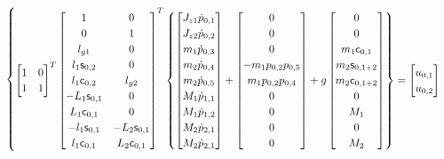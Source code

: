 \begin{itemize}
\begin{equation}
\begin{cases}
\begin{bmatrix}
1 & 0 \\
1 & 1 \\
\end{bmatrix}^T
\begin{bmatrix}
 1 & 0 \\
 0 & 1 \\
 l_{g1} & 0 \\
 l_1 \mathsf{s}_{0,2} & 0 \\
 l_1 \mathsf{c}_{0,2} & l_{g2} \\
 -L_1 \mathsf{s}_{0,1} & 0 \\
 L_1 \mathsf{c}_{0,1} & 0 \\
 -l_1 \mathsf{s}_{0,1} & -L_2 \mathsf{s}_{0,1} \\
 l_1 \mathsf{c}_{0,1} & L_2 \mathsf{c}_{0,1} \\
\end{bmatrix}^T
\begin{Bmatrix}
	\begin{bmatrix}
	J_{z1} \dot{p}_{0,1} \\
	J_{z2} \dot{p}_{0,2} \\
	m_1 \dot{p}_{0,3} \\
	m_2 \dot{p}_{0,4} \\
	m_2 \dot{p}_{0,5} \\
	M_1 \dot{p}_{1,1} \\
	M_1 \dot{p}_{1,2} \\
	M_2 \dot{p}_{2,1} \\
	M_2 \dot{p}_{2,1} \\
	\end{bmatrix}
	+
	\begin{bmatrix}
	0 \\
	0 \\
	0 \\
	- m_1 p_{0,2} p_{0,5} \\
	  m_1 p_{0,2} p_{0,4} \\
	0 \\
	0 \\
	0 \\
	0 \\
	\end{bmatrix}
	+
	g \begin{bmatrix}
	0 \\
	0 \\
	m_1 \mathsf{c}_{0,1} \\
	m_2 \mathsf{s}_{0,1+2} \\
	m_2 \mathsf{c}_{0,1+2} \\
	0 \\
	M_1 \\
	0 \\
	M_2 \\
	\end{bmatrix}
\end{Bmatrix}
=
\begin{bmatrix}
u_{0,1} \\
u_{0,2}
\end{bmatrix} \\


\end{cases}
\end{equation}
\end{itemize}
